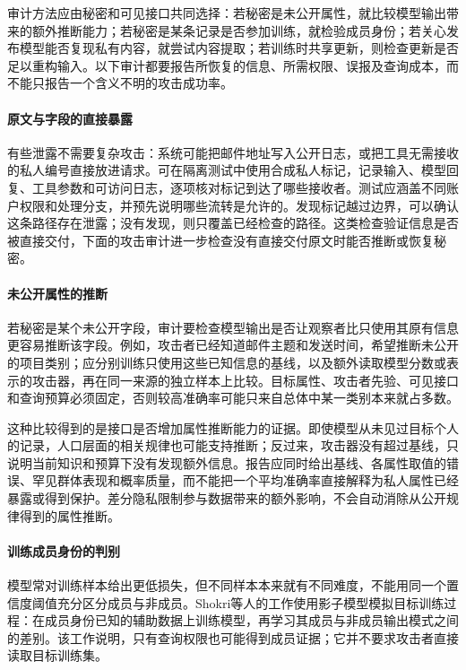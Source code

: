 审计方法应由秘密和可见接口共同选择：若秘密是未公开属性，就比较模型输出带来的额外推断能力；若秘密是某条记录是否参加训练，就检验成员身份；若关心发布模型能否复现私有内容，就尝试内容提取；若训练时共享更新，则检查更新是否足以重构输入。以下审计都要报告所恢复的信息、所需权限、误报及查询成本，而不能只报告一个含义不明的攻击成功率。

\paragraph{原文与字段的直接暴露}

有些泄露不需要复杂攻击：系统可能把邮件地址写入公开日志，或把工具无需接收的私人编号直接放进请求。可在隔离测试中使用合成私人标记，记录输入、模型回复、工具参数和可访问日志，逐项核对标记到达了哪些接收者。测试应涵盖不同账户权限和处理分支，并预先说明哪些流转是允许的。发现标记越过边界，可以确认这条路径存在泄露；没有发现，则只覆盖已经检查的路径。这类检查验证信息是否被直接交付，下面的攻击审计进一步检查没有直接交付原文时能否推断或恢复秘密。

\paragraph{未公开属性的推断}

若秘密是某个未公开字段，审计要检查模型输出是否让观察者比只使用其原有信息更容易推断该字段。例如，攻击者已经知道邮件主题和发送时间，希望推断未公开的项目类别；应分别训练只使用这些已知信息的基线，以及额外读取模型分数或表示的攻击器，再在同一来源的独立样本上比较。目标属性、攻击者先验、可见接口和查询预算必须固定，否则较高准确率可能只来自总体中某一类别本来就占多数。

这种比较得到的是接口是否增加属性推断能力的证据。即使模型从未见过目标个人的记录，人口层面的相关规律也可能支持推断；反过来，攻击器没有超过基线，只说明当前知识和预算下没有发现额外信息。报告应同时给出基线、各属性取值的错误、罕见群体表现和概率质量，而不能把一个平均准确率直接解释为私人属性已经暴露或得到保护。差分隐私限制参与数据带来的额外影响，不会自动消除从公开规律得到的属性推断。

\paragraph{训练成员身份的判别}

模型常对训练样本给出更低损失，但不同样本本来就有不同难度，不能用同一个置信度阈值充分区分成员与非成员。Shokri等人的工作使用影子模型模拟目标训练过程：在成员身份已知的辅助数据上训练模型，再学习其成员与非成员输出模式之间的差别。该工作说明，只有查询权限也可能得到成员证据；它并不要求攻击者直接读取目标训练集。

